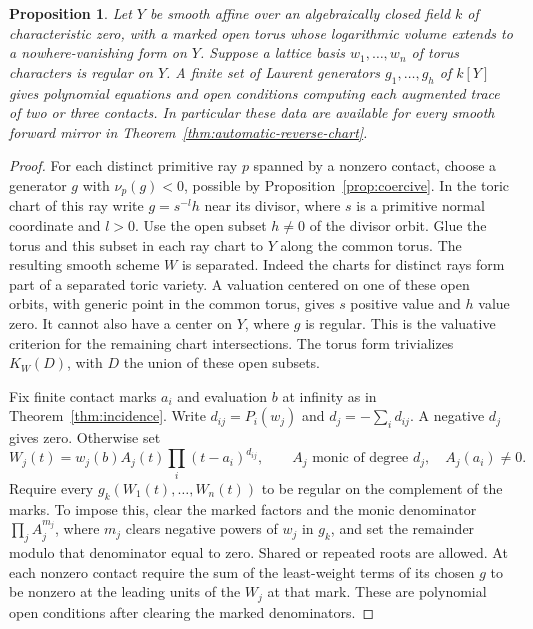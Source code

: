 \documentclass[11pt,reqno]{amsart}
\numberwithin{equation}{section}
\newtheorem{proposition}[theorem]{Proposition}
\theoremstyle{definition}
\theoremstyle{remark}
\begin{document}
\begin{proposition}\label{prop:laurent-generator-traces}
Let \(Y\) be smooth affine over an algebraically closed field \(k\) of characteristic zero,
with a marked open torus whose logarithmic volume extends to a nowhere-vanishing form on \(Y\). Suppose a lattice basis
\(w_1,\ldots,w_n\) of torus characters is regular on \(Y\).
A finite set of Laurent generators \(g_1,\ldots,g_h\) of \(k[Y]\)
gives polynomial equations and open conditions computing each
augmented trace of two or three contacts. In particular these data
are available for every smooth forward mirror in
Theorem~\ref{thm:automatic-reverse-chart}.
\end{proposition}
\begin{proof}
For each distinct primitive ray \(p\) spanned by a nonzero contact, choose a generator
\(g\) with \(\nu_p(g)<0\), possible by Proposition~\ref{prop:coercive}.
In the toric chart of this ray write \(g=s^{-l}h\) near its divisor,
where \(s\) is a primitive normal coordinate and \(l>0\).
Use the open subset \(h\ne0\) of the divisor orbit.
Glue the torus and this subset in each ray chart to \(Y\) along
the common torus. The resulting smooth scheme \(W\) is separated.
Indeed the charts for distinct rays form part of a separated toric
variety. A valuation centered on one of these open orbits, with generic
point in the common torus, gives \(s\) positive value and \(h\)
value zero. It cannot also have a center on \(Y\), where \(g\)
is regular. This is the valuative criterion for the remaining
chart intersections. The torus form trivializes \(K_W(D)\), with
\(D\) the union of these open subsets.

Fix finite contact marks \(a_i\) and evaluation \(b\) at infinity
as in Theorem~\ref{thm:incidence}. Write \(d_{ij}=P_i(w_j)\) and
\(d_j=-\sum_i d_{ij}\). A negative \(d_j\) gives zero. Otherwise set
\[ W_j(t)=w_j(b)A_j(t)\prod_i(t-a_i)^{d_{ij}}, \qquad A_j\text{ monic of degree }d_j,\quad A_j(a_i)\ne0. \]
Require every \(g_k(W_1(t),\ldots,W_n(t))\) to be regular on the
complement of the marks. To impose this, clear the marked factors and
the monic denominator \(\prod_j A_j^{m_j}\), where \(m_j\) clears
negative powers of \(w_j\) in \(g_k\), and set the remainder modulo
that denominator equal to zero. Shared or repeated roots are allowed.
At each nonzero contact require the sum of the least-weight terms
of its chosen \(g\) to be nonzero at the leading units of the \(W_j\)
at that mark. These are polynomial
open conditions after clearing the marked denominators.


\end{proof}
\end{document}
